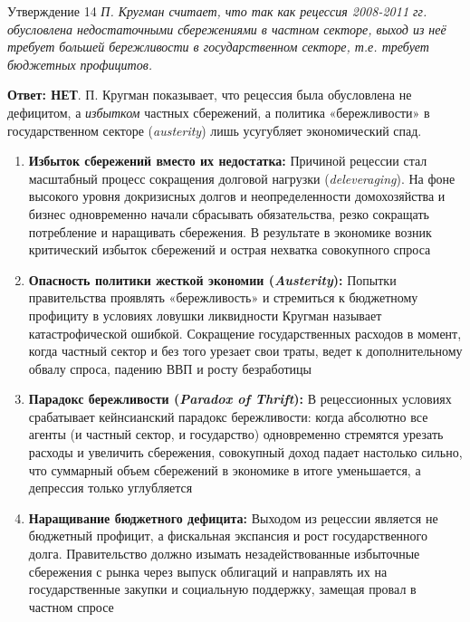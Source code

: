 \documentclass[10pt,a4paper]{article}
\newcommand{\qnet}{\textbf{\color{nored}Ответ: НЕТ}}
\newenvironment{answer}[2]{%
  \begin{qbox}{Утверждение #1}
  \textit{#2}\par\smallskip
}{%
  \end{qbox}\vspace{2pt}
}
\begin{document}
\begin{answer}{14}{П. Кругман считает, что так как рецессия 2008-2011 гг. обусловлена недостаточными сбережениями в частном секторе, выход из неё требует большей бережливости в государственном секторе, т.е. требует бюджетных профицитов.}
\qnet. П. Кругман показывает, что рецессия была обусловлена не дефицитом, а \textit{избытком} частных сбережений, а политика «бережливости» в государственном секторе (\textit{austerity}) лишь усугубляет экономический спад.

\begin{enumerate}
    \item \textbf{Избыток сбережений вместо их недостатка:}
    Причиной рецессии стал масштабный процесс сокращения долговой нагрузки (\textit{deleveraging}). На фоне высокого уровня докризисных долгов и неопределенности домохозяйства и бизнес одновременно начали сбрасывать обязательства, резко сокращать потребление и наращивать сбережения. В результате в экономике возник критический избыток сбережений и острая нехватка совокупного спроса

    \item \textbf{Опасность политики жесткой экономии (\textit{Austerity}):}
    Попытки правительства проявлять «бережливость» и стремиться к бюджетному профициту в условиях ловушки ликвидности Кругман называет катастрофической ошибкой. Сокращение государственных расходов в момент, когда частный сектор и без того урезает свои траты, ведет к дополнительному обвалу спроса, падению ВВП и росту безработицы

    \item \textbf{Парадокс бережливости (\textit{Paradox of Thrift}):}
    В рецессионных условиях срабатывает кейнсианский парадокс бережливости: когда абсолютно все агенты (и частный сектор, и государство) одновременно стремятся урезать расходы и увеличить сбережения, совокупный доход падает настолько сильно, что суммарный объем сбережений в экономике в итоге уменьшается, а депрессия только углубляется

    \item \textbf{Наращивание бюджетного дефицита:}
    Выходом из рецессии является не бюджетный профицит, а фискальная экспансия и рост государственного долга. Правительство должно изымать незадействованные избыточные сбережения с рынка через выпуск облигаций и направлять их на государственные закупки и социальную поддержку, замещая провал в частном спросе
\end{enumerate}
\end{answer}
\end{document}
